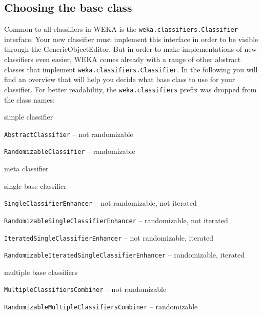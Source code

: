 %
%
%
%


\subsection{Choosing the base class}
Common to all classifiers in WEKA is the \texttt{weka.classifiers.Classifier}
interface. Your new classifier must implement this interface in order to be
visible through the GenericObjectEditor. But in order to make implementations of
new classifiers even easier, WEKA comes already with a range of other abstract
classes that implement \texttt{weka.classifiers.Classifier}. In the following
you will find an overview that will help you decide what base class to use for
your classifier. For better readability, the \texttt{weka.classifiers} prefix
was dropped from the class names:
\begin{tight_itemize}
  \item simple classifier
	\begin{tight_itemize}
	  \item \texttt{AbstractClassifier} -- not randomizable
	  \item \texttt{RandomizableClassifier} -- randomizable
	\end{tight_itemize}
  \item meta classifier
	\begin{tight_itemize}
	  \item single base classifier
		\begin{tight_itemize}
		  \item \texttt{SingleClassifierEnhancer} -- not randomizable, not
iterated
		  \item \texttt{RandomizableSingleClassifierEnhancer} -- randomizable,
not iterated
		  \item \texttt{IteratedSingleClassifierEnhancer} -- not randomizable,
iterated
		  \item \texttt{RandomizableIteratedSingleClassifierEnhancer} --
randomizable, iterated
		\end{tight_itemize}
	  \item multiple base classifiers
		\begin{tight_itemize}
		  \item \texttt{MultipleClassifiersCombiner} -- not randomizable
		  \item \texttt{RandomizableMultipleClassifiersCombiner} -- randomizable
		\end{tight_itemize}
	\end{tight_itemize}
\end{tight_itemize}
